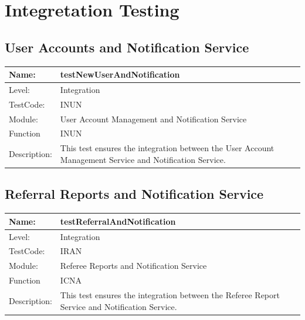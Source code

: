 \documentclass[12pt]{article}
\begin{document}
\newpage
\section{Integretation Testing}

\subsection{User Accounts and Notification Service}
\begin{center}
\begin{tabular}{|l|p{12cm}|}
\hline
 Name: & testNewUserAndNotification  \\
\hline
Level: & Integration \\
\hline
TestCode: & INUN \\
\hline
Module:& User Account Management and Notification Service \\
\hline
Function & INUN \\
\hline
Description: & This test ensures the integration between the User Account Management Service and Notification Service. \\
\hline
\end{tabular}
\end{center}

\subsection{Referral Reports and Notification Service}
\begin{center}
\begin{tabular}{|l|p{12cm}|}
\hline
 Name: & testReferralAndNotification  \\
\hline
Level: & Integration \\
\hline
TestCode: & IRAN \\
\hline
Module:& Referee Reports and Notification Service \\
\hline
Function & ICNA \\
\hline
Description: & This test ensures the integration between the Referee Report Service and Notification Service. \\
\hline
\end{tabular}
\end{center}
\end{document}
